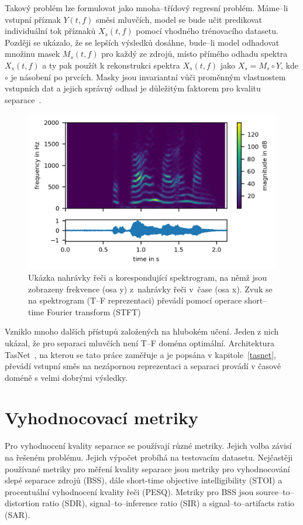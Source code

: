 Takový problém lze formulovat jako mnoha--třídový regresní problém. Máme--li vstupní příznak $Y(t,f)$ směsi mluvčích, model se bude učit predikovat individuální tok příznaků $X_s(t,f)$ pomocí vhodného trénovacího datasetu. Později se ukázalo, že se lepších výsledků dosáhne, bude--li model odhadovat množinu masek $M_s(t,f)$ pro každý ze zdrojů, místo přímého odhadu spektra $X_s(t,f)$ a ty pak použít k rekonstrukci spektra $X_s(t,f)$ jako $X_s = M_s \circ Y$, kde $\circ$ je násobení po prvcích. Masky jsou invariantní vůči proměnným vlastnostem vstupních dat a jejich správný odhad je důležitým faktorem pro kvalitu separace~\cite{cocktailparty}.


\begin{figure}[H]
    \centering
    \includegraphics[scale=1.0]{obrazky-figures/spektrum.png}
    \caption{\label{fig:spektrum}Ukázka nahrávky řeči a korespondující spektrogram, na němž jsou zobrazeny frekvence (osa y) z~nahrávky řeči v~čase (osa x). Zvuk se na spektrogram (T--F reprezentaci) převádí pomocí operace short--time Fourier transform (STFT)}
\end{figure}


Vzniklo mnoho dalších přístupů založených na hlubokém učení. Jeden z nich ukázal, že pro separaci mluvčích není T--F doména optimální. Architektura TasNet~\cite{luo2018convtasnet}, na kterou se tato práce zaměřuje a je popsána v kapitole~\ref{tasnet}, převádí vstupní směs na nezápornou reprezentaci a separaci provádí v časové doméně s velmi dobrými výsledky.



\section{Vyhodnocovací metriky}
Pro vyhodnocení kvality separace se používají různé metriky. Jejich volba závisí na řešeném problému. Jejich výpočet probíhá na testovacím datasetu. Nejčastěji používané metriky pro měření kvality separace jsou metriky pro vyhodnocování slepé separace zdrojů (BSS), dále short-time objective intelligibility (STOI) a procentuální vyhodnocení kvality řeči (PESQ). Metriky pro BSS jsou source--to--distortion ratio (SDR), signal--to--inference ratio (SIR) a signal--to--artifacts ratio (SAR).



